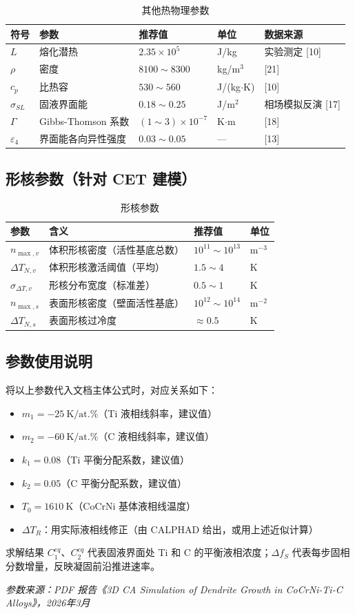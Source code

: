 \documentclass[12pt, a4paper]{article}
\begin{document}
\begin{table}[h!]
\centering
\caption{其他热物理参数}
\begin{tabular}{lllll}
\toprule
符号 & 参数 & 推荐值 & 单位 & 数据来源 \\
\midrule
$L$ & 熔化潜热 & $2.35 \times 10^5$ & J/kg & 实验测定 [10] \\
$\rho$ & 密度 & $8100 \sim 8300$ & kg/m$^3$ & [21] \\
$c_p$ & 比热容 & $530 \sim 560$ & J/(kg$\cdot$K) & [10] \\
$\sigma_{SL}$ & 固液界面能 & $0.18 \sim 0.25$ & J/m$^2$ & 相场模拟反演 [17] \\
$\Gamma$ & Gibbs-Thomson 系数 & $(1\sim3)\times10^{-7}$ & K$\cdot$m & [18] \\
$\varepsilon_4$ & 界面能各向异性强度 & $0.03 \sim 0.05$ & — & [13] \\
\bottomrule
\end{tabular}
\end{table}

\subsection{形核参数（针对 CET 建模）}

\begin{table}[h!]
\centering
\caption{形核参数}
\begin{tabular}{llll}
\toprule
参数 & 含义 & 推荐值 & 单位 \\
\midrule
$n_{\max,v}$ & 体积形核密度（活性基底总数） & $10^{11} \sim 10^{13}$ & m$^{-3}$ \\
$\Delta T_{N,v}$ & 体积形核激活阈值（平均） & $1.5 \sim 4$ & K \\
$\sigma_{\Delta T,v}$ & 形核分布宽度（标准差） & $0.5 \sim 1$ & K \\
$n_{\max,s}$ & 表面形核密度（壁面活性基底） & $10^{12} \sim 10^{14}$ & m$^{-2}$ \\
$\Delta T_{N,s}$ & 表面形核过冷度 & $\approx 0.5$ & K \\
\bottomrule
\end{tabular}
\end{table}

\subsection{参数使用说明}

将以上参数代入文档主体公式时，对应关系如下：
\begin{itemize}
  \item $m_1 = -25\ \text{K/at.\%}$（Ti 液相线斜率，建议值）
  \item $m_2 = -60\ \text{K/at.\%}$（C 液相线斜率，建议值）
  \item $k_1 = 0.08$（Ti 平衡分配系数，建议值）
  \item $k_2 = 0.05$（C 平衡分配系数，建议值）
  \item $T_0 = 1610\ \text{K}$（CoCrNi 基体液相线温度）
  \item $\Delta T_R$：用实际液相线修正（由 CALPHAD 给出，或用上述近似计算）
\end{itemize}

求解结果 $C_1^{eq}$、$C_2^{eq}$ 代表固液界面处 Ti 和 C 的平衡液相浓度；$\Delta f_S$ 代表每步固相分数增量，反映凝固前沿推进速率。

\bigskip
\noindent\textit{参数来源：PDF 报告《3D CA Simulation of Dendrite Growth in CoCrNi-Ti-C Alloys》，2026年3月}
\end{document}
